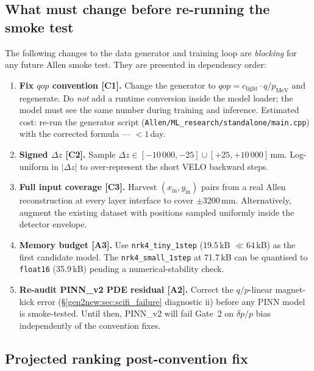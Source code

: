 \documentclass[a4paper,11pt]{article}
\begin{document}
\subsection{What must change before re-running the smoke test}

The following changes to the data generator and training loop are
\emph{blocking} for any future Allen smoke test.  They are presented
in dependency order:

\begin{enumerate}
  \item \textbf{Fix $qop$ convention [C1].}  Change the generator to
        $qop = c_\text{light}\cdot q / p_\text{MeV}$ and regenerate.
        Do \emph{not} add a runtime conversion inside the model loader;
        the model must see the same number during training and inference.
        Estimated cost: re-run the generator script
        (\texttt{Allen/ML\_research/standalone/main.cpp}) with the
        corrected formula --- $<1$\,day.
  \item \textbf{Signed $\Delta z$ [C2].}  Sample
        $\Delta z\in[-10\,000,-25]\cup[+25,+10\,000]$\,mm.
        Log-uniform in $|\Delta z|$ to over-represent the short
        VELO backward steps.
  \item \textbf{Full input coverage [C3].}  Harvest $(x_\text{in},
        y_\text{in})$ pairs from a real Allen reconstruction at every
        layer interface to cover $\pm 3200$\,mm.  Alternatively,
        augment the existing dataset with positions sampled uniformly
        inside the detector envelope.
  \item \textbf{Memory budget [A3].}  Use \texttt{nrk4\_tiny\_1step}
        (19.5\,kB $\ll 64$\,kB) as the first candidate model.
        The \texttt{nrk4\_small\_1step} at 71.7\,kB can be
        quantised to \texttt{float16} (35.9\,kB) pending a
        numerical-stability check.
  \item \textbf{Re-audit PINN\_v2 PDE residual [A2].}  Correct the
        $q/p$-linear magnet-kick error (§\ref{gen2new:sec:scifi_failure}
        diagnostic ii) before any PINN model is smoke-tested.  Until
        then, PINN\_v2 will fail Gate~2 on $\delta p/p$ bias
        independently of the convention fixes.
\end{enumerate}

\subsection{Projected ranking post-convention fix}
\end{document}
